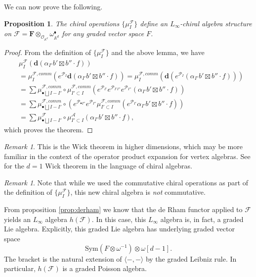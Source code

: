 \documentclass[11pt]{amsart}
\newtheorem{prop}[thm]{Proposition}
\theoremstyle{definition}
\theoremstyle{remark}
\newtheorem{rem}[thm]{Remark}
\numberwithin{equation}{section}
\begin{document}
We can now prove the following.

\begin{prop}
    The chiral operations $\{\mu^{\mathcal{F}}_{{I}}\}$ define an $L_{\infty}$-chiral algebra structure on $\mathcal{F}
    =\mathbf{F}\otimes_{\mathcal{O}_{\mathbb{A}^d}} \omega_{\mathbb{A}^d}^{\blacklozenge}$ for any graded vector space
    $F$.
\end{prop}
\begin{proof}
From the definition of  $\{\mu^{\mathcal{F}}_{{I}}\}$ and the above lemma, we have
\begin{align*}
&\mu^{\mathcal{F}}_{{I}}\left(\mathbf{d}(\alpha_{{I'}}b'\boxtimes b''\cdot f)\right)\\
&=\mu^{\mathcal{F},comm}_{{I}}\left(e^{{\mathcal{P}}_{{I}}}\mathbf{d}(\alpha_{{I'}}b'\boxtimes b''\cdot f)\right)
=\mu^{\mathcal{F},comm}_{{I}}\left(\mathbf{d}(e^{{\mathcal{P}}_{{I}}}(\alpha_{{I'}}b'\boxtimes b''\cdot f))\right)\\
&=\sum \mu^{\mathcal{F},comm}_{\bullet\bigsqcup {I}-{I'}}\circ \mu^{\mathcal{F},comm}_{{I'}\subset{I}}\left(e^{{\mathcal{P}}_{{I'}}}e^{{\mathcal{P}}_{{I'}{I''}}}e^{{\mathcal{P}}_{{I''}}}(\alpha_{{I'}}b'\boxtimes b''\cdot f) \right)\\
&=\sum \mu^{\mathcal{F},comm}_{\bullet\bigsqcup {I}-{I'}}\circ \left(e^{{\mathcal{P}}_{\bullet{I''}}}e^{{\mathcal{P}}
_{{I''}}} \mu^{\mathcal{F},comm}_{{I'}\subset {I}}(e^{{\mathcal{P}}_{{I'}}}\alpha_{{I'}}b'\boxtimes b''\cdot f)\right)\\
&=\sum \mu^{\mathcal{F}}_{\bullet\bigsqcup{I}-{I'}}\circ \mu^{\mathcal{A}}_{{I'}\subset {I}}\left(\alpha_{{I'}}b'\boxtimes b''\cdot f\right),
\end{align*}
which proves the theorem.
 \end{proof}
\begin{rem}
  This is the Wick theorem in higher dimensions, which may be more familiar in the context of the operator product
  expansion for vertex algebras. 
  See \cite{gui2023} for the $d=1$ Wick theorem in the language of chiral algebras.    
\end{rem}
\begin{rem}
  Note that while we used the commutative chiral operations as part of the definition of $\{\mu_I^{\mathcal{F}}\}$,
  this new chiral algebra is \textit{not} commutative.
\end{rem}

From proposition \ref{prop:derham} we know that the de Rham functor applied to $\mathcal{F}$ yields an $L_\infty$
algebra $h(\mathcal{F})$.
In this case, this $L_\infty$ algebra is, in fact, a graded Lie algebra.
Explicitly, this graded Lie algebra has underlying graded vector space 
\begin{equation}\label{}
  \mathrm{Sym} \left(F \otimes \omega^{-1}\right) \otimes \omega [d-1] . 
\end{equation}
The bracket is the natural extension of $\langle - , - \rangle$ by the graded Leibniz rule.
In particular, $h(\mathcal{F})$ is a graded Poisson algebra.
\end{document}

